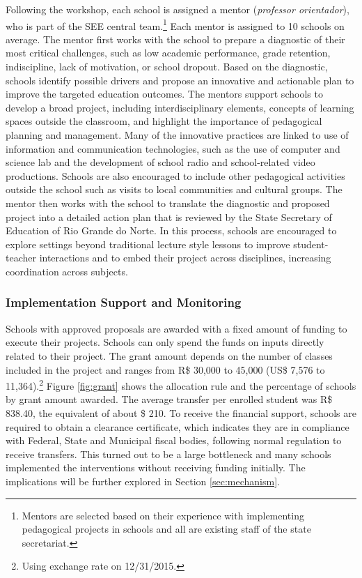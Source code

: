 \documentclass[11pt,a4paper]{article}
\begin{document}
Following the workshop, each school is assigned a mentor (\textit{professor orientador}), who is part of the SEE central team.\footnote{Mentors are selected based on their experience with implementing pedagogical projects in schools and all are existing staff of the state secretariat.} Each mentor is assigned to 10 schools on average. The mentor first works with the school to prepare a diagnostic of their most critical challenges, such as low academic performance, grade retention, indiscipline, lack of motivation, or school dropout. Based on the diagnostic, schools identify possible drivers and propose an innovative and actionable plan to improve the targeted education outcomes. The mentors support schools to develop a broad project, including interdisciplinary elements, concepts of learning spaces outside the classroom, and highlight the importance of pedagogical planning and management. Many of the innovative practices are linked to use of information and communication technologies, such as the use of computer and science lab and the development of school radio and school-related video productions. Schools are also encouraged to include other pedagogical activities outside the school such as visits to local communities and cultural groups. The mentor then works with the school to translate the diagnostic and proposed project into a detailed action plan that is reviewed by the State Secretary of Education of Rio Grande do Norte. In this process, schools are encouraged to explore settings beyond traditional lecture style lessons to improve student-teacher interactions and to embed their project across disciplines, increasing coordination across subjects. 

\subsubsection*{Implementation Support and Monitoring} \label{sec:implement}

Schools with approved proposals are awarded with a fixed amount of funding to execute their projects. Schools can only spend the funds on inputs directly related to their project. The grant amount depends on the number of classes included in the project and ranges from R\$ 30,000 to 45,000 (US\$ 7,576 to 11,364).\footnote{Using exchange rate on 12/31/2015.} Figure \ref{fig:grant} shows the allocation rule and the percentage of schools by grant amount awarded. The average transfer per enrolled student was R\$ 838.40, the equivalent of about \$ 210. To receive the financial support, schools are required to obtain a clearance certificate, which indicates they are in compliance with Federal, State and Municipal fiscal bodies, following normal regulation to receive transfers. This turned out to be a large bottleneck and many schools implemented the interventions without receiving funding initially. The implications will be further explored in Section \ref{sec:mechanism}.
\end{document}
